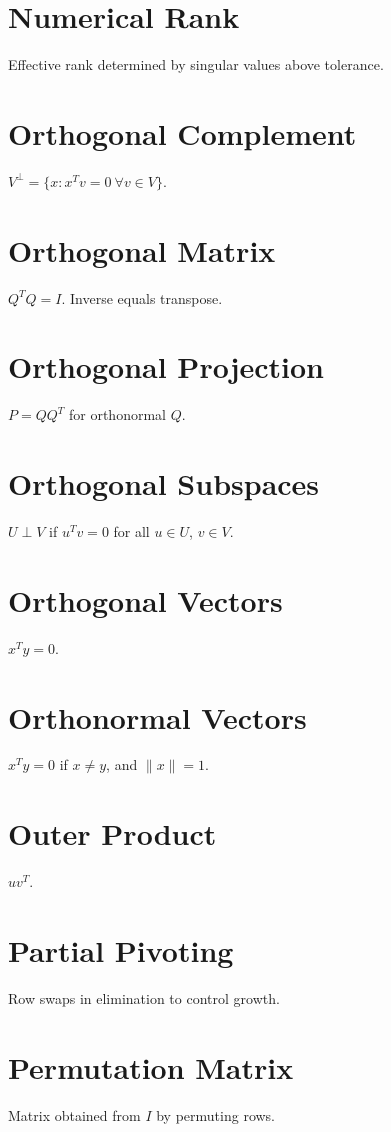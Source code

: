 \documentclass[12pt]{book}
\begin{document}
\chapter{Numerical Rank}
Effective rank determined by singular values above tolerance.

\chapter{Orthogonal Complement}
$V^\perp = \{x : x^Tv=0 \ \forall v\in V\}$.

\chapter{Orthogonal Matrix}
$Q^T Q = I$. Inverse equals transpose.

\chapter{Orthogonal Projection}
$P = QQ^T$ for orthonormal $Q$.

\chapter{Orthogonal Subspaces}
$U \perp V$ if $u^Tv=0$ for all $u \in U$, $v \in V$.

\chapter{Orthogonal Vectors}
$x^Ty=0$.

\chapter{Orthonormal Vectors}
$x^Ty = 0$ if $x \neq y$, and $\|x\|=1$.

\chapter{Outer Product}
$uv^T$.

\chapter{Partial Pivoting}
Row swaps in elimination to control growth.

\chapter{Permutation Matrix}
Matrix obtained from $I$ by permuting rows.
\end{document}
